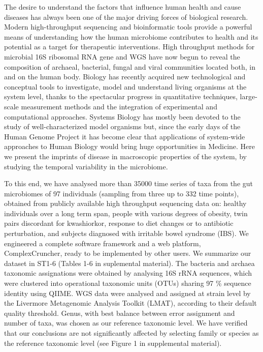 \documentclass[aps,prl,twocolumn,superscriptaddress,showpacs]{revtex4}
\begin{document}
The desire to understand the factors that influence human health and cause diseases has always been one of the major driving forces of biological research. Modern high-throughput sequencing and bioinformatic tools provide a powerful means of understanding how the human microbiome contributes to health and its potential as a target for therapeutic interventions. High throughput methods for microbial 16S ribosomal RNA gene and WGS have now begun to reveal the composition of archaeal, bacterial, fungal and viral communities located both, in and on the human body. Biology has recently acquired new technological and conceptual tools to investigate, model and understand living organisms at the system level, thanks to the spectacular progress in quantitative techniques, large-scale measurement methods and the integration of experimental and computational approaches. Systems Biology has mostly been devoted to the study of well-characterized model organisms but, since the early days of the Human Genome Project it has become clear that applications of system-wide approaches to Human Biology would bring huge opportunities in Medicine. Here we present the imprints of disease in macroscopic properties of the system, by studying the temporal variability in the microbiome.

To this end, we have analysed more than 35000 time series of taxa from the gut microbiomes of 97 individuals (sampling from three up to 332 time points), obtained from publicly available high throughput sequencing data on: healthy individuals over a long term span\cite{moving}, people with various degrees of obesity\cite{lea}, twin pairs discordant for kwashiorkor\cite{kwashiorkor}, response to diet changes\cite{diet} or to antibiotic perturbation\cite{antibiotic}, and subjects diagnosed with irritable bowel syndrome (IBS)\cite{durban}. 
We engineered a complete software framework and a web platform, ComplexCruncher, ready to be implemented by other users.  
We summarize our dataset in ST1-6 (Tables 1-6 in suplemental material). The bacteria and archaea taxonomic assignations were obtained by analysing 16S rRNA sequences, which were clustered into operational taxonomic units (OTUs) sharing 97 \% sequence identity using QIIME\cite{qiime}. WGS data\cite{kwashiorkor} were analysed and assigned at strain level by the Livermore Metagenomic Analysis Toolkit (LMAT)\cite{lmat}, according to their default quality threshold. Genus, with best balance between error assignment and number of taxa, was chosen as our reference taxonomic level. We have verified that our conclusions are not significantly affected by selecting family or species as the reference taxonomic level (see Figure 1 in supplemental material).
\end{document}
